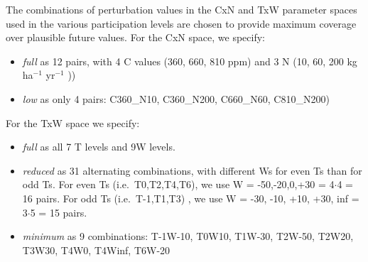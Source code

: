 \documentclass[gmd, manuscript]{copernicus} %
\begin{document}
The combinations of perturbation values in the CxN and TxW parameter spaces used in the various participation levels are chosen to provide maximum coverage over plausible future values. For the CxN space, we specify:
\begin{itemize}
\item \textit{full} as 12 pairs, with 4 C values (360, 660, 810 ppm) and 3 N (10, 60, 200 kg ha$^{-1}$ yr$^{-1}$ ))
\item \textit{low} as only 4 pairs: C360\_N10, C360\_N200, C660\_N60, C810\_N200) 
\end{itemize}
		
For the	TxW space we specify:
\begin{itemize}
\item \textit{full} as all 7 T levels and 9W levels.
\item \textit{reduced} as 31 alternating combinations, with different Ws for even Ts than for odd Ts. For even Ts (i.e.\ T0,T2,T4,T6), we use W = -50,-20,0,+30 = 4$\cdot$4 = 16 pairs. For odd Ts (i.e.\ T-1,T1,T3) , we use W = -30, -10, +10, +30, inf = 3$\cdot$5 = 15 pairs.
\item \textit{minimum} as 9 combinations: T-1W-10, T0W10, T1W-30, T2W-50, T2W20, T3W30, T4W0, T4Winf, T6W-20
\end{itemize}
\end{document}
